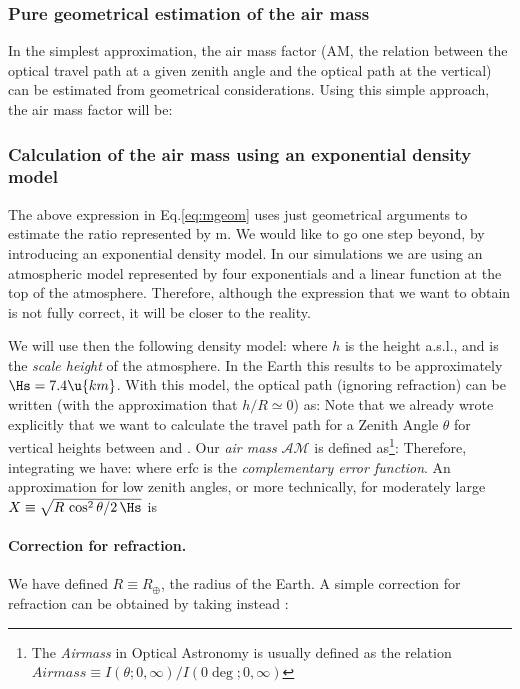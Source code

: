 \subsubsection{Pure geometrical estimation of the air mass}

In the simplest approximation, the air mass factor (AM, the relation
between the optical travel path at a given zenith angle and the
optical path at the vertical) can be estimated from geometrical
considerations. Using this simple approach, the air mass factor will
be:
%
\mgeomeq

\subsubsection{Calculation of the air mass using an 
exponential density model}

The above expression in Eq.\eqref{eq:mgeom} uses just geometrical
arguments to estimate the ratio represented by m. We would like to go
one step beyond, by introducing an exponential density model. In our
simulations we are using an atmospheric model represented by four
exponentials and a linear function at the top of the atmosphere.
Therefore, although the expression that we want to obtain is not fully
correct, it will be closer to the reality.

We will use then the following density model:
%
\denseq
%
where $h$ is the height a.s.l., and \Hs is the \emph{scale height} of
the atmosphere. In the Earth this results to be approximately $\Hs =
7.4\u{km}$. With this model, the optical path (ignoring refraction)
can be written (with the approximation that $h/R \simeq 0$) as:
%
\optpathredeq
%
Note that we already wrote explicitly that we want to calculate the
travel path for a Zenith Angle $\theta$ for vertical heights between
\ho and \hv. Our \emph{air mass} $\mathcal{AM}$ is defined
as\footnote{The \emph{Airmass} in Optical Astronomy is usually defined
  as the relation $\mathit{Airmass} \equiv
  {I(\theta;0,\infty)}/{I(0\deg;0,\infty)} $}:
%
\AMdefeq
%
Therefore, integrating we have:
%
\AMfulleq
%
where $\mathrm{erfc}$ is the \emph{complementary error function}. An
approximation for low zenith angles, or more technically, for
moderately large $X\equiv\sqrt{{R\,\cos^2\theta}/{2\,\Hs}}$ is
%
\AMapproxeq

\paragraph{Correction for refraction.} We have defined $R \equiv
R_\oplus$, the radius of the Earth. A simple correction for refraction
can be obtained by taking instead \cite{KK}:
%

